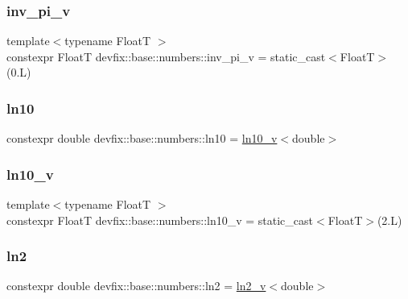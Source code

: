 \subsubsection{\texorpdfstring{inv\+\_\+pi\+\_\+v}{inv\_pi\_v}}
{\footnotesize\ttfamily template$<$typename FloatT $>$ \\
constexpr FloatT devfix\+::base\+::numbers\+::inv\+\_\+pi\+\_\+v = static\+\_\+cast$<$FloatT$>$(0.\+L)}

\mbox{\label{namespacedevfix_1_1base_1_1numbers_aa9349b4fcaba4fc0f6da676265f99397}} 
\subsubsection{\texorpdfstring{ln10}{ln10}}
{\footnotesize\ttfamily constexpr double devfix\+::base\+::numbers\+::ln10 = \hyperlink{namespacedevfix_1_1base_1_1numbers_a2dcf5bcbf25739e4964272d4f5c20f3f}{ln10\+\_\+v}$<$double$>$}

\mbox{\label{namespacedevfix_1_1base_1_1numbers_a2dcf5bcbf25739e4964272d4f5c20f3f}} 
\subsubsection{\texorpdfstring{ln10\+\_\+v}{ln10\_v}}
{\footnotesize\ttfamily template$<$typename FloatT $>$ \\
constexpr FloatT devfix\+::base\+::numbers\+::ln10\+\_\+v = static\+\_\+cast$<$FloatT$>$(2.\+L)}

\mbox{\label{namespacedevfix_1_1base_1_1numbers_a3cd216aaf5d432a90bb8ce09fd187dba}} 
\subsubsection{\texorpdfstring{ln2}{ln2}}
{\footnotesize\ttfamily constexpr double devfix\+::base\+::numbers\+::ln2 = \hyperlink{namespacedevfix_1_1base_1_1numbers_a6fa1c65988b6d3574b4916b6423fc217}{ln2\+\_\+v}$<$double$>$}

